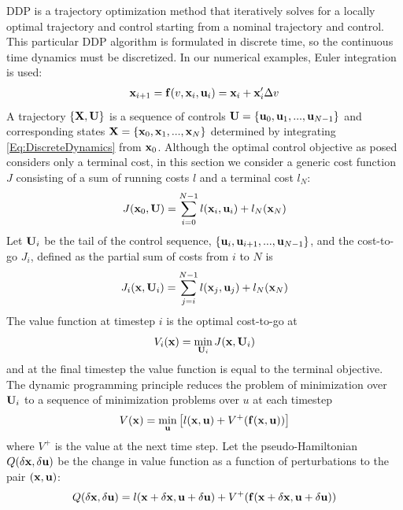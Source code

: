 DDP is a trajectory optimization method that iteratively solves for a locally optimal trajectory and control starting from a nominal trajectory and control.
This particular DDP algorithm is formulated in discrete time, so the continuous time dynamics must be discretized. In our numerical examples, Euler integration is used:
\begin{align}
	\mathbf{x}_{i+1} = \mathbf{f}(v, \mathbf{x}_i,\mathbf{u}_i) = \mathbf{x}_i + \mathbf{x}_i'\Delta v \label{Eq:DiscreteDynamics}
\end{align}
A trajectory $\{\mathbf{X},\mathbf{U}\}$ is a sequence of controls $ \mathbf{U}=\{\mathbf{u}_0,\mathbf{u}_1,...,\mathbf{u}_{N-1}\} $ and corresponding states $\mathbf{X}=\{\mathbf{x}_0,\mathbf{x}_1,...,\mathbf{x}_N\}$ determined by integrating \eqref{Eq:DiscreteDynamics} from $\mathbf{x}_0$.
Although the optimal control objective as posed considers only a terminal cost, in this section we consider a generic cost function $J$ consisting of a sum of running costs $l$ and a terminal cost $l_N$:
\begin{align}
	J(\mathbf{x}_0,\mathbf{U}) = \sum_{i=0}^{N-1}l(\mathbf{x}_i,\mathbf{u}_i) + l_N(\mathbf{x}_N)
\end{align}
Let $\mathbf{U}_i$ be the tail of the control sequence, $\{\mathbf{u}_i,\mathbf{u}_{i+1},...,\mathbf{u}_{N-1}\}$, and the cost-to-go $J_i$, defined as the partial sum of costs from $i$ to $N$ is
\begin{align}
	J_i(\mathbf{x},\mathbf{U}_i) = \sum_{j=i}^{N-1}l(\mathbf{x}_j,\mathbf{u}_j) + l_N(\mathbf{x}_N)
\end{align}
The value function at timestep $i$ is the optimal cost-to-go at \state
\begin{align}
	V_i(\mathbf{x}) = \min_{\mathbf{U}_i} J(\mathbf{x}, \mathbf{U}_i)
\end{align}
and at the final timestep the value function is equal to the terminal objective. The dynamic programming principle reduces the problem of minimization over $\mathbf{U}_i$ to a sequence of minimization problems over $u$ at each timestep 
\begin{align}
	V(\mathbf{x}) = \min_{\mathbf{u}}\left[l(\mathbf{x},\mathbf{u}) + V^+(\mathbf{f}(\mathbf{x},\mathbf{u}))\right] \label{eq_dynamic_programming}
\end{align}
where $V^+$ is the value at the next time step.
Let the pseudo-Hamiltonian $Q(\delta\mathbf{x},\delta\mathbf{u})$ be the change in value function as a function of perturbations to the pair $(\mathbf{x},\mathbf{u})$:
\begin{align}
	Q(\delta\mathbf{x},\delta\mathbf{u}) = l(\mathbf{x}+\delta\mathbf{x},\mathbf{u}+\delta\mathbf{u}) + V^+(\mathbf{f}(\mathbf{x}+\delta\mathbf{x},\mathbf{u}+\delta\mathbf{u}))
\end{align}
